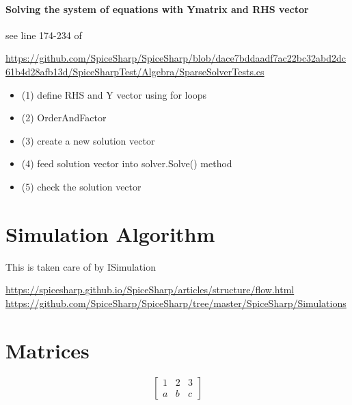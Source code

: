 \documentclass[12pt]{article}
\renewcommand{\_}{\kern-1.5pt\textunderscore\kern-1.5pt}
\begin{document}
\subsection{Solving the system of equations with Ymatrix and RHS vector}

see line 174-234 of


\url{https://github.com/SpiceSharp/SpiceSharp/blob/dace7bddaadf7ac22bc32abd2dc61b4d28afb13d/SpiceSharpTest/Algebra/SparseSolverTests.cs}

\begin{itemize}
\item (1) define RHS and Y vector using for loops
\item (2) OrderAndFactor
\item (3) create a new solution vector
\item (4) feed solution vector into solver.Solve() method
\item (5) check the solution vector
\end{itemize}


\part{Simulation Algorithm}

This is taken care of by ISimulation

\url{https://spicesharp.github.io/SpiceSharp/articles/structure/flow.html}
\url{https://github.com/SpiceSharp/SpiceSharp/tree/master/SpiceSharp/Simulations}


\part{Matrices}

$$\begin{bmatrix}
1 & 2 & 3 \\
a & b & c
\end{bmatrix}$$

 
\end{document}
